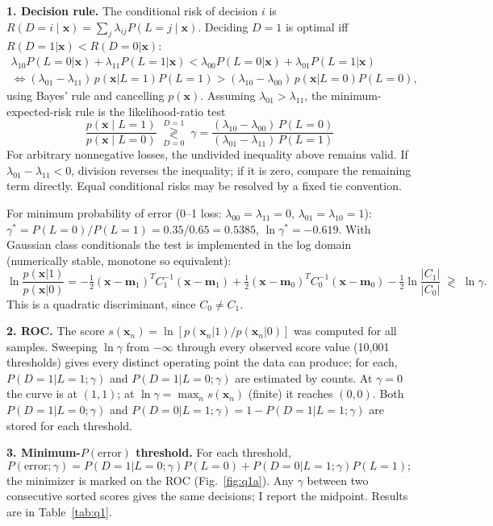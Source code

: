 \documentclass[10pt]{article}
\newcommand{\x}{\mathbf{x}}
\newcommand{\m}{\mathbf{m}}
\begin{document}
\textbf{1. Decision rule.} The conditional risk of decision $i$ is $R(D{=}i\mid\x)=\sum_j\lambda_{ij}P(L{=}j\mid\x)$. Deciding $D=1$ is optimal iff $R(D{=}1|\x)<R(D{=}0|\x)$:
\begin{gather*}
\lambda_{10}P(L{=}0|\x)+\lambda_{11}P(L{=}1|\x) < \lambda_{00}P(L{=}0|\x)+\lambda_{01}P(L{=}1|\x)\\
\iff (\lambda_{01}-\lambda_{11})\,p(\x|L{=}1)P(L{=}1) > (\lambda_{10}-\lambda_{00})\,p(\x|L{=}0)P(L{=}0),
\end{gather*}
using Bayes' rule and cancelling $p(\x)$. Assuming $\lambda_{01}>\lambda_{11}$, the minimum-expected-risk rule is the likelihood-ratio test
\[
\boxed{\;\frac{p(\x\mid L=1)}{p(\x\mid L=0)} \;\underset{D=0}{\overset{D=1}{\gtrless}}\; \gamma=\frac{(\lambda_{10}-\lambda_{00})\,P(L=0)}{(\lambda_{01}-\lambda_{11})\,P(L=1)}\;}
\]
For arbitrary nonnegative losses, the undivided inequality above remains valid. If $\lambda_{01}-\lambda_{11}<0$, division reverses the inequality; if it is zero, compare the remaining term directly. Equal conditional risks may be resolved by a fixed tie convention.

For minimum probability of error (0--1 loss: $\lambda_{00}=\lambda_{11}=0$, $\lambda_{01}=\lambda_{10}=1$): $\gamma^*=P(L{=}0)/P(L{=}1)=0.35/0.65=0.5385$, $\ln\gamma^*=-0.619$.
With Gaussian class conditionals the test is implemented in the log domain (numerically stable, monotone so equivalent):
\[
\ln\frac{p(\x|1)}{p(\x|0)} = -\tfrac12(\x-\m_1)^T C_1^{-1}(\x-\m_1)+\tfrac12(\x-\m_0)^T C_0^{-1}(\x-\m_0)-\tfrac12\ln\frac{|C_1|}{|C_0|}\;\gtrless\;\ln\gamma .
\]
This is a quadratic discriminant, since $C_0\neq C_1$.

\textbf{2. ROC.} The score $s(\x_n)=\ln[p(\x_n|1)/p(\x_n|0)]$ was computed for all samples. Sweeping $\ln\gamma$ from $-\infty$ through every observed score value (10{,}001 thresholds) gives every distinct operating point the data can produce; for each, $P(D{=}1|L{=}1;\gamma)$ and $P(D{=}1|L{=}0;\gamma)$ are estimated by counts. At $\gamma=0$ the curve is at $(1,1)$; at $\ln\gamma=\max_n s(\x_n)$ (finite) it reaches $(0,0)$. Both $P(D{=}1|L{=}0;\gamma)$ and $P(D{=}0|L{=}1;\gamma)=1-P(D{=}1|L{=}1;\gamma)$ are stored for each threshold.

\textbf{3. Minimum-$P(\text{error})$ threshold.} For each threshold,
\[P(\text{error};\gamma)=P(D{=}1|L{=}0;\gamma)P(L{=}0)+P(D{=}0|L{=}1;\gamma)P(L{=}1);\]
the minimizer is marked on the ROC (Fig.~\ref{fig:q1a}). Any $\gamma$ between two consecutive sorted scores gives the same decisions; I report the midpoint. Results are in Table~\ref{tab:q1}.
\end{document}
